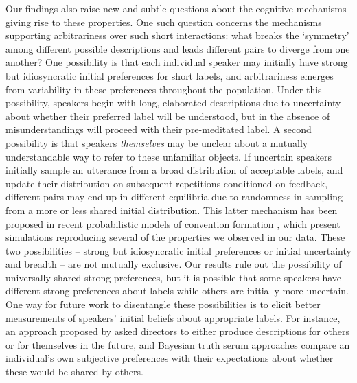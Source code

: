\documentclass[alpha-refs]{wiley-article}
\begin{document}
Our findings also raise new and subtle questions about the cognitive mechanisms giving rise to these properties.
One such question concerns the mechanisms supporting arbitrariness over such short interactions: what breaks the `symmetry' among different possible descriptions and leads different pairs to diverge from one another?
One possibility is that each individual speaker may initially have strong but idiosyncratic initial preferences for short labels, and arbitrariness emerges from variability in these preferences throughout the population.
Under this possibility, speakers begin with long, elaborated descriptions due to uncertainty about whether their preferred label will be understood, but in the absence of misunderstandings will proceed with their pre-meditated label.
A second possibility is that speakers \emph{themselves} may be unclear about a mutually understandable way to refer to these unfamiliar objects.
If uncertain speakers initially sample an utterance from a broad distribution of acceptable labels, and update their distribution on subsequent repetitions conditioned on feedback, different pairs may end up in different equilibria due to randomness in sampling from a more or less shared initial distribution. 
This latter mechanism has been proposed in recent probabilistic models of convention formation \citep{smith_learning_2013,hawkins_convention-formation_2017,Brochagen17}, which present simulations reproducing several of the properties we observed in our data.
These two possibilities -- strong but idiosyncratic initial preferences or initial uncertainty and breadth -- are not mutually exclusive.
Our results rule out the possibility of universally shared strong preferences, but it is possible that some speakers have different strong preferences about labels while others are initially more uncertain.
One way for future work to disentangle these possibilities is to elicit better measurements of speakers' initial beliefs about appropriate labels.
For instance, an approach proposed by \cite{FussellKrauss89_IntendedAudienceCommonGround} asked directors to either produce descriptions for others or for themselves in the future, and Bayesian truth serum approaches \citep{prelec2004bayesian} compare an individual's own subjective preferences with their expectations about whether these would be shared by others.
\end{document}

